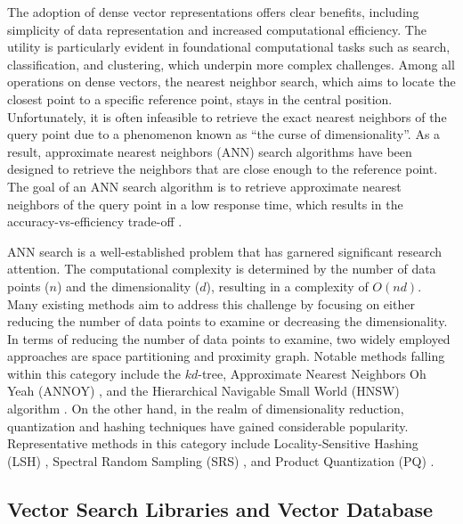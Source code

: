 \documentclass[11pt]{article}
\def\cred{\textcolor{red}}
\begin{document}
The adoption of dense vector representations offers clear benefits, including simplicity of data representation and increased computational efficiency. The utility is particularly evident in foundational computational tasks such as search, classification, and clustering, which underpin more complex challenges. Among all operations on dense vectors, the nearest neighbor search, which aims to locate the closest point to a specific reference point, stays in the central position. Unfortunately, it is often infeasible to retrieve the exact nearest neighbors of the query point due to a phenomenon known as “the curse of dimensionality”. As a result, approximate nearest neighbors (ANN) search algorithms have been designed to retrieve the neighbors that are close enough to the reference point. The goal of an ANN search algorithm is to retrieve approximate nearest neighbors of the query point in a low response time,
which results in the accuracy-vs-efficiency trade-off  \cite{NEURIPS2019_09853c7f}. 

ANN search is a well-established problem that has garnered significant research attention. The computational complexity is determined by the number of data points ($n$) and the dimensionality ($d$), resulting in a complexity of $O(nd)$. Many existing methods aim to address this challenge by focusing on either reducing the number of data points to examine or decreasing the dimensionality. In terms of reducing the number of data points to examine, two widely employed approaches are space partitioning and proximity graph. Notable methods falling within this category include the $kd$-tree, Approximate Nearest Neighbors Oh Yeah (ANNOY) \cite{annoy}, and the Hierarchical Navigable Small World (HNSW) algorithm \cite{10.1109/TPAMI.2018.2889473}. On the other hand, in the realm of dimensionality reduction, quantization and hashing techniques have gained considerable popularity. Representative methods in this category include Locality-Sensitive Hashing (LSH) \cite{e2LSH}, Spectral Random Sampling (SRS) \cite{SRS}, and Product Quantization (PQ) \cite{DBLP:journals/pami/JegouDS11}.

\subsection{Vector Search Libraries and Vector Database}
\end{document}
